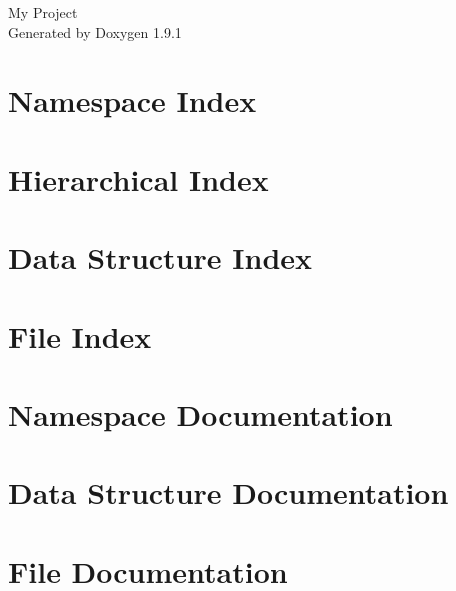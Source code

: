 \let\mypdfximage\pdfximage\def\pdfximage{\immediate\mypdfximage}\documentclass[twoside]{book}
\newcommand{\+}{\discretionary{\mbox{\scriptsize$\hookleftarrow$}}{}{}}
\newcommand{\clearemptydoublepage}{%
  \newpage{\pagestyle{empty}\cleardoublepage}%
}
\begin{document}
\raggedbottom

\hypersetup{pageanchor=false,
             bookmarksnumbered=true,
             pdfencoding=unicode
            }
\begin{titlepage}
\vspace*{7cm}
\begin{center}%
{\Large My Project }\\
\vspace*{1cm}
{\large Generated by Doxygen 1.9.1}\\
\end{center}
\end{titlepage}
\clearemptydoublepage
{}
\tableofcontents
\clearemptydoublepage
{}
\hypersetup{pageanchor=true}

\chapter{Namespace Index}

\chapter{Hierarchical Index}

\chapter{Data Structure Index}

\chapter{File Index}

\chapter{Namespace Documentation}






\chapter{Data Structure Documentation}

\chapter{File Documentation}







\backmatter
\newpage
{}
\clearemptydoublepage
{}
\printindex
\end{document}
